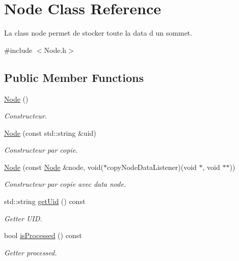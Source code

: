 \hypertarget{class_node}{}\section{Node Class Reference}
\label{class_node}


La class node permet de stocker toute la data d un sommet.  




{\ttfamily \#include $<$Node.\+h$>$}

\subsection*{Public Member Functions}
\begin{DoxyCompactItemize}
\item 
\mbox{\hyperlink{class_node_ad7a34779cad45d997bfd6d3d8043c75f}{Node}} ()
\begin{DoxyCompactList}\small\item\em Constructeur. \end{DoxyCompactList}\item 
\mbox{\hyperlink{class_node_a639cdb8009e80b20bfdb0575c765c713}{Node}} (const std\+::string \&uid)
\begin{DoxyCompactList}\small\item\em Constructeur par copie. \end{DoxyCompactList}\item 
\mbox{\hyperlink{class_node_a2d318229a996fe2654bf53428a4ff283}{Node}} (const \mbox{\hyperlink{class_node}{Node}} \&node, void($\ast$copy\+Node\+Data\+Listener)(void $\ast$, void $\ast$$\ast$))
\begin{DoxyCompactList}\small\item\em Constructeur par copie avec data node. \end{DoxyCompactList}\item 
std\+::string \mbox{\hyperlink{class_node_a53a0fb412c1047a27e07e7e4c5749bee}{get\+Uid}} () const
\begin{DoxyCompactList}\small\item\em Getter U\+ID. \end{DoxyCompactList}\item 
bool \mbox{\hyperlink{class_node_a1fa00bc88d4a66614ee06c913dbda27f}{is\+Processed}} () const
\begin{DoxyCompactList}\small\item\em Getter processed. \end{DoxyCompactList}\item 
$$
\end{DoxyCompactItemize}
